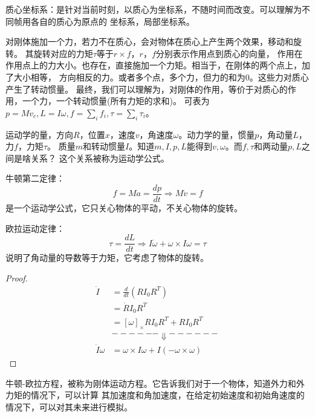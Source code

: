\documentclass[lang=cn,newtx,10pt,scheme=chinese]{elegantbook}
\begin{document}
质心坐标系：是针对当前时刻，以质心为坐标系，不随时间而改变。可以理解为不同帧用各自的质心为原点的
坐标系，局部坐标系。

对刚体施加一个力，若力不在质心，会对物体在质心上产生两个效果，移动和旋转。
其旋转对应的力矩$\tau$等于$r \times f$，$r，f$分别表示作用点到质心的向量，
作用在作用点上的力大小。也存在，直接施加一个力矩。相当于，在刚体的两个点上，加了大小相等，
方向相反的力。或者多个点，多个力，但力的和为0。这些力对质心产生了转动惯量。
最终，我们可以理解为，对刚体的作用，等价于对质心的作用，一个力，一个转动惯量(所有力矩的求和)。
可表为$p=Mv_c, L=I\omega, f = \sum_i f_i, \tau=\sum_i \tau_i$。

运动学的量，方向$R$，位置$x$，速度$v$，角速度$\omega$。动力学的量，惯量$p$，角动量$L$，力$f$，力矩$\tau$。
质量$m$和转动惯量$I$。知道$m, I, p, L$能得到$v, \omega$。而$f, \tau$和两动量$p, L$之间是啥关系？
这个关系被称为运动学公式。

牛顿第二定律：
\begin{equation}
  f=Ma=\frac{d p}{d t}\Rightarrow M \dot{v}=f
\end{equation}
是一个运动学公式，它只关心物体的平动，不关心物体的旋转。

欧拉运动定律： 
\begin{equation}
  \tau = \frac{d L}{d t}\Rightarrow I \dot{\omega} + \omega\times I\omega =\tau
\end{equation}
说明了角动量的导数等于力矩，它考虑了物体的旋转。
\begin{proof}
  \begin{equation*}
    \begin{aligned}
      \dot{I}&= \frac{d}{d t}(RI_0 R^T)\\
      &=\dot{R}I_{0}R^T \\
      &=[\omega]_{\times}RI_0 R^{T}+RI_0 R^T \\
      & ------\Downarrow ------\\
     \dot{I}\omega & = \omega \times I\omega + I(-\omega \times \omega)
    \end{aligned}
  \end{equation*}
\end{proof}
牛顿-欧拉方程，被称为刚体运动方程。它告诉我们对于一个物体，知道外力和外力矩的情况下，可以计算
其加速度和角加速度，在给定初始速度和初始角速度的情况下，可以对其未来进行模拟。
\end{document}
